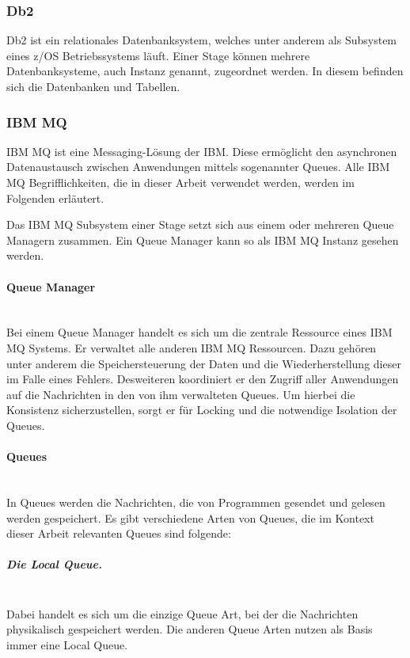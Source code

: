 \subsubsection{Db2}\label{sssec:db2}
Db2 ist ein relationales Datenbanksystem, welches unter anderem als Subsystem eines z/OS Betriebssystems läuft.
Einer Stage können mehrere Datenbanksysteme, auch Instanz genannt, zugeordnet werden.
In diesem befinden sich die Datenbanken und Tabellen.

\subsubsection{IBM MQ}\label{sec:mq}
IBM MQ ist eine Messaging-Lösung der IBM.
Diese ermöglicht den asynchronen Datenaustausch zwischen Anwendungen mittels sogenannter Queues.
Alle IBM MQ Begrifflichkeiten, die in dieser Arbeit verwendet werden, werden im Folgenden erläutert.
\cite{Aranha.2013}

Das IBM MQ Subsystem einer Stage setzt sich aus einem oder mehreren Queue Managern zusammen.
Ein Queue Manager kann so als IBM MQ Instanz gesehen werden.

\paragraph{Queue Manager}~\\
Bei einem Queue Manager handelt es sich um die zentrale Ressource eines IBM MQ Systems.
Er verwaltet  alle anderen IBM MQ Ressourcen.
Dazu gehören unter anderem die Speichersteuerung der Daten und die Wiederherstellung dieser im Falle eines Fehlers.
Desweiteren koordiniert er den Zugriff aller Anwendungen auf die Nachrichten in den von ihm verwalteten Queues.
Um hierbei die Konsistenz sicherzustellen, sorgt er für Locking und die notwendige Isolation der Queues.
\cite{Aranha.2013}

\paragraph{Queues}~\\
In Queues werden die Nachrichten, die von Programmen gesendet und gelesen werden gespeichert.
Es gibt verschiedene Arten von Queues, die im Kontext dieser Arbeit relevanten Queues sind folgende:

\subparagraph{Die Local Queue.}~\\
Dabei handelt es sich um die einzige Queue Art, bei der die Nachrichten physikalisch gespeichert werden.
Die anderen Queue Arten nutzen als Basis immer eine Local Queue.

